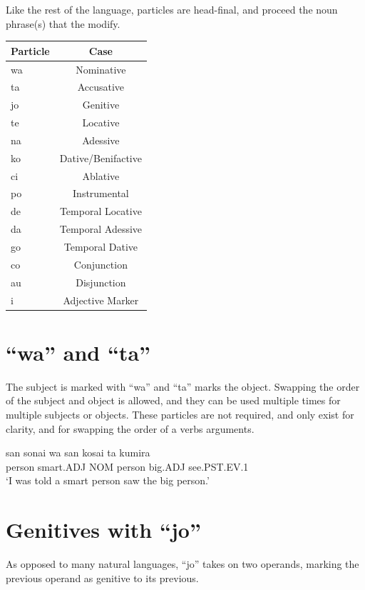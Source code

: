 \documentclass{clgrammar}
\begin{document}
Like the rest of the language, particles are head-final, and proceed the noun phrase(s) that the modify.
\begin{center}
	\begin{tabular}{l|c}
		Particle & Case \\
		\hline
		wa & Nominative \\
		ta & Accusative \\
		jo & Genitive \\
		te & Locative \\
		na & Adessive \\
		ko & Dative/Benifactive \\
		ci & Ablative \\
		po & Instrumental \\
		de & Temporal Locative \\
		da & Temporal Adessive \\
		go & Temporal Dative \\
		co & Conjunction \\
		au & Disjunction \\
		i & Adjective Marker \\

\end{tabular}
\end{center}

\section{``wa'' and ``ta''}
The subject is marked with ``wa'' and ``ta'' marks the object. Swapping the order of the subject and object is allowed, and they can be used multiple times for multiple subjects or objects. These particles are not required, and only exist for clarity, and for swapping the order of a verbs arguments. 

\begin{exe}
	\ex
	\gll san sonai wa san kosai ta kumira \\
	person smart.ADJ NOM person big.ADJ see.PST.EV.1 \\
	\trans `I was told a smart person saw the big person.'
\end{exe}


\section{Genitives with ``jo''}
As opposed to many natural languages, ``jo'' takes on two operands, marking the previous operand as genitive to its previous.
\end{document}
